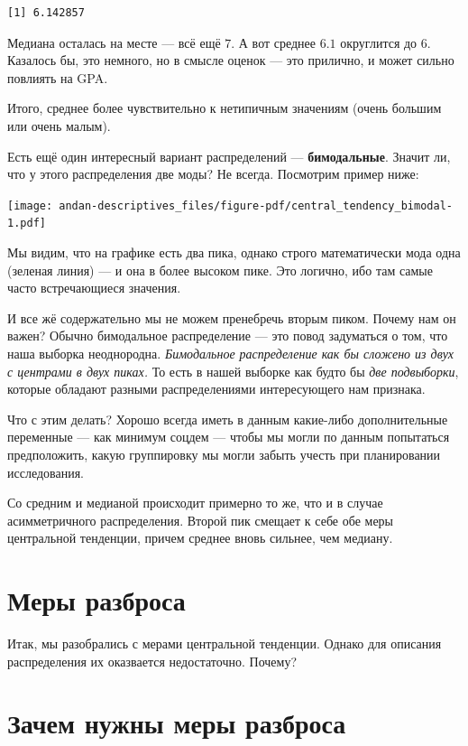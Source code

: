 \documentclass[
  letterpaper,
]{scrbook}
\theoremstyle{definition}
\theoremstyle{remark}
\begin{document}
\begin{verbatim}
[1] 6.142857
\end{verbatim}

Медиана осталась на месте --- всё ещё \(7\). А вот среднее \(6.1\)
округлится до \(6\). Казалось бы, это немного, но в смысле оценок ---
это прилично, и может сильно повлиять на GPA.

Итого, среднее более чувствительно к нетипичным значениям (очень большим
или очень малым).

Есть ещё один интересный вариант распределений --- \textbf{бимодальные}.
Значит ли, что у этого распределения две моды? Не всегда. Посмотрим
пример ниже:

\texttt{[image: andan-descriptives\_files/figure-pdf/central\_tendency\_bimodal-1.pdf]}

Мы видим, что на графике есть два пика, однако строго математически мода
одна (зеленая линия) --- и она в более высоком пике. Это логично, ибо
там самые часто встречающиеся значения.

И все жё содержательно мы не можем пренебречь вторым пиком. Почему нам
он важен? Обычно бимодальное распределение --- это повод задуматься о
том, что наша выборка неоднородна. \emph{Бимодальное распределение как
бы сложено из двух с центрами в двух пиках.} То есть в нашей выборке как
будто бы \emph{две подвыборки}, которые обладают разными распределениями
интересующего нам признака.

Что с этим делать? Хорошо всегда иметь в данным какие-либо
дополнительные переменные --- как минимум соцдем --- чтобы мы могли по
данным попытаться предположить, какую группировку мы могли забыть учесть
при планировании исследования.

Со средним и медианой происходит примерно то же, что и в случае
асимметричного распределения. Второй пик смещает к себе обе меры
центральной тенденции, причем среднее вновь сильнее, чем медиану.

\section{Меры разброса}\label{andan-descriptives-variability}

Итак, мы разобрались с мерами центральной тенденции. Однако для описания
распределения их оказвается недостаточно. Почему?

\section{Зачем нужны меры разброса}\label{why_we_need_variation}
\end{document}
